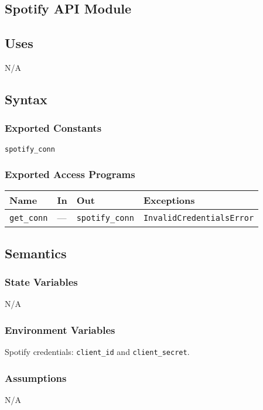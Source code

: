 \documentclass[12pt, titlepage]{article}
\begin{document}
\subsection{Spotify API Module}

\subsection{Uses}
N/A

\subsection{Syntax}

\subsubsection{Exported Constants}
\texttt{spotify\_conn}

\subsubsection{Exported Access Programs}

\begin{center}
\begin{tabular}{llll}
\hline
\textbf{Name} & \textbf{In} & \textbf{Out} & \textbf{Exceptions}\\
\hline
\texttt{get\_conn} & --- & \texttt{spotify\_conn} & \texttt{InvalidCredentialsError} \\
\hline
\end{tabular}
\end{center}

\subsection{Semantics}

\subsubsection{State Variables}
N/A

\subsubsection{Environment Variables}
Spotify credentials: \texttt{client\_id} and \texttt{client\_secret}.

\subsubsection{Assumptions}
N/A
\end{document}
